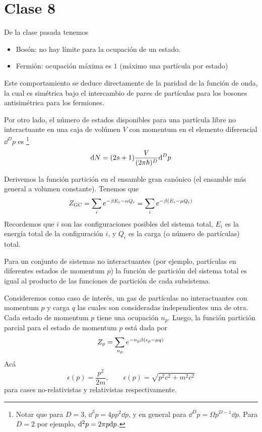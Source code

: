 \section{Clase 8}
De la clase pasada tenemos
\begin{itemize}
	\item Bosón: no hay límite para la ocupación de un estado.
	\item Fermión: ocupación máxima es $1$ (máximo una partícula por estado)
\end{itemize}
Este comportamiento se deduce directamente de la paridad de la función de onda, la cual es simétrica bajo el intercambio de pares de partículas para los bosones  antisimétrica para los fermiones. 

Por otro lado, el número de estados disponibles para una partícula libre no interactuante en una caja de volúmen $V$ con momentum en el elemento diferencial $\dd^D p$ es \footnote{Notar que para $D=3$, $\dd^3p=4p p^2\dd p$, y en general para $\dd^Dp=\Omega p^{D-1}\dd p$. Para $D=2$ por ejemplo, $\dd^2 p=2\pi p\dd p$.}
\begin{equation}
	\dd N=(2s+1)\frac{V}{(2\pi\hbar)^D}\dd^Dp
\end{equation}

Derivemos la función partición en el ensamble gran canónico (el ensamble más general a volumen constante). Tenemos que
\begin{equation}
  Z_{\rm GC}=\sum_i e^{-\beta E_i-\alpha Q_i}=\sum_i e^{-\beta(E_i-\mu Q_i)}
\end{equation}
Recordemos que $i$ son las configuraciones posibles del sistema total, $E_i$ es la energía total de la configuración $i$, y $Q_i$ es la carga (o número de partículas) total.

Para un conjunto de sistemas no interactuantes (por ejemplo, partículas en diferentes estados de momentum $p$) la función de partición del sistema total es igual al producto de las funciones de partición de cada subsistema.

Consideremos como caso de interés, un gas de partículas no interactuantes con momentum $p$ y carga $q$ las cuales son consideradas independientes una de otra. Cada estado de momentum $p$ tiene una ocupación $n_p$. Luego, la función partición parcial para el estado de momentum $p$ está dada por
\begin{equation}
  Z_{p}=\sum_{n_p}e^{-n_p\beta (\epsilon	_p-\mu q)}
\end{equation}
Acá 
\begin{equation}
  \epsilon(p)=\frac{p^2}{2m},\qquad \epsilon(p)=\sqrt{p^2c^2+m^2c^2}
\end{equation}
para cases no-relativistas y relativistas respectivamente.

